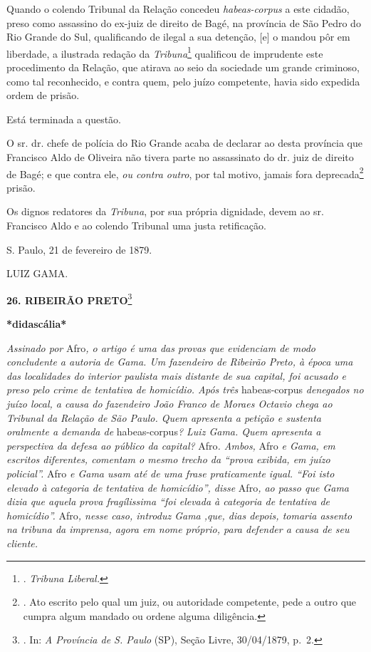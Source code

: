 Quando o colendo Tribunal da Relação concedeu \emph{habeas-corpus} a
este cidadão, preso como assassino do ex-juiz de direito de Bagé, na
província de São Pedro do Rio Grande do Sul, qualificando de ilegal a
sua detenção, {[}e{]} o mandou pôr em liberdade, a ilustrada redação da
\emph{Tribuna}\footnote{. \emph{Tribuna Liberal.}} qualificou de
imprudente este procedimento da Relação, que atirava ao seio da
sociedade um grande criminoso, como tal reconhecido, e contra quem, pelo
juízo competente, havia sido expedida ordem de prisão.

Está terminada a questão.

O sr. dr. chefe de polícia do Rio Grande acaba de declarar ao desta
província que Francisco Aldo de Oliveira não tivera parte no assassinato
do dr. juiz de direito de Bagé; e que contra ele, \emph{ou contra
outro}, por tal motivo, jamais fora deprecada\footnote{. Ato escrito
  pelo qual um juiz, ou autoridade competente, pede a outro que cumpra
  algum mandado ou ordene alguma diligência.} prisão.

Os dignos redatores da \emph{Tribuna}, por sua própria dignidade, devem
ao sr. Francisco Aldo e ao colendo Tribunal uma justa retificação.

S. Paulo, 21 de fevereiro de 1879.

LUIZ GAMA.

\textbf{26. RIBEIRÃO PRETO}\footnote{. In: \emph{A Província de S.
  Paulo} (SP), Seção Livre, 30/04/1879, p.~2.}

\textbf{*didascália*}

\emph{Assinado por} Afro\emph{, o artigo é uma das provas que evidenciam
de modo concludente a autoria de Gama. Um fazendeiro de Ribeirão Preto,
à época uma das localidades do interior paulista mais distante de sua
capital, foi acusado e preso pelo crime de tentativa de homicídio. Após
três} habeas-corpus \emph{denegados no juízo local, a causa do
fazendeiro João Franco de Moraes Octavio chega ao Tribunal da Relação de
São Paulo. Quem apresenta a petição e sustenta oralmente a demanda de}
habeas-corpus\emph{? Luiz Gama. Quem apresenta a perspectiva da defesa
ao público da capital?} Afro\emph{. Ambos,} Afro \emph{e Gama, em
escritos diferentes, comentam o mesmo trecho da ``prova exibida, em
juízo policial''.} Afro \emph{e Gama usam até de uma frase praticamente
igual. ``Foi isto elevado à categoria de tentativa de homicídio'',
disse} Afro\emph{, ao passo que Gama dizia que aquela prova fragílissima
``foi elevada à categoria de tentativa de homicídio''.} Afro\emph{,
nesse caso, introduz Gama ,que, dias depois, tomaria assento na tribuna
da imprensa, agora em nome próprio, para defender a causa de seu
cliente.}

